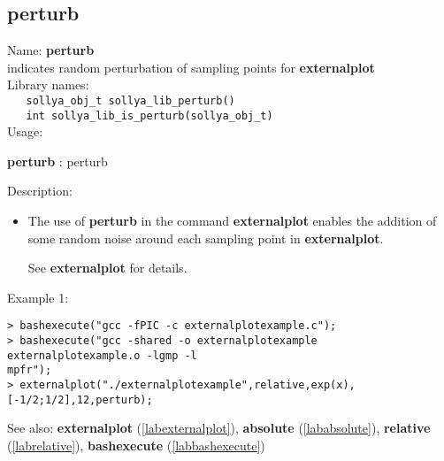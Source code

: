 \subsection{perturb}
\label{labperturb}
\noindent Name: \textbf{perturb}\\
\phantom{aaa}indicates random perturbation of sampling points for \textbf{externalplot}\\[0.2cm]
\noindent Library names:\\
\verb|   sollya_obj_t sollya_lib_perturb()|\\
\verb|   int sollya_lib_is_perturb(sollya_obj_t)|\\[0.2cm]
\noindent Usage: 
\begin{center}
\textbf{perturb} : \textsf{perturb}\\
\end{center}
\noindent Description: \begin{itemize}

\item The use of \textbf{perturb} in the command \textbf{externalplot} enables the addition
   of some random noise around each sampling point in \textbf{externalplot}.
    
   See \textbf{externalplot} for details.
\end{itemize}
\noindent Example 1: 
\begin{center}\begin{minipage}{15cm}\begin{Verbatim}[frame=single,commandchars=\\\|\~]
> bashexecute("gcc -fPIC -c externalplotexample.c");
> bashexecute("gcc -shared -o externalplotexample externalplotexample.o -lgmp -l
mpfr");
> externalplot("./externalplotexample",relative,exp(x),[-1/2;1/2],12,perturb);
\end{Verbatim}
\end{minipage}\end{center}
See also: \textbf{externalplot} (\ref{labexternalplot}), \textbf{absolute} (\ref{lababsolute}), \textbf{relative} (\ref{labrelative}), \textbf{bashexecute} (\ref{labbashexecute})
